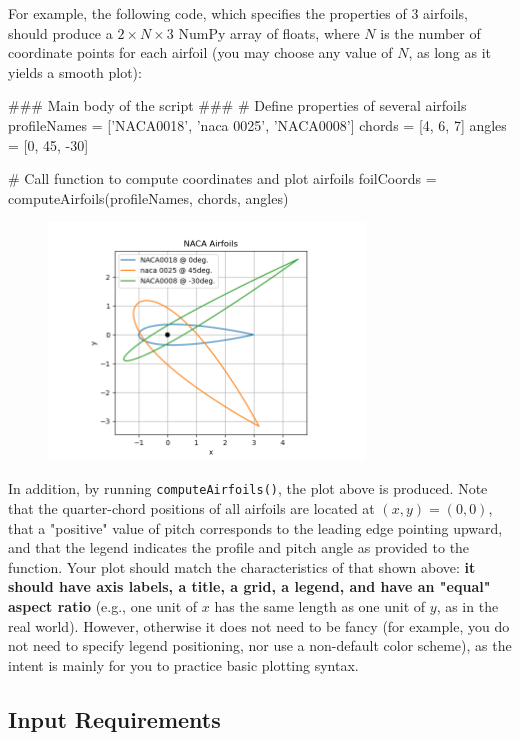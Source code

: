 \documentclass{homework}
\begin{document}
For example, the following code, which specifies the properties of 3 airfoils, should produce a $2\!\times\!N\!\times\!3$ NumPy array of floats, where $N$ is the number of coordinate points for each airfoil (you may choose any value of $N$, as long as it yields a smooth plot):

\begin{python}
### Main body of the script ### 
# Define properties of several airfoils
profileNames = ['NACA0018', 'naca 0025', 'NACA0008']
chords = [4, 6, 7]
angles = [0, 45, -30]

# Call function to compute coordinates and plot airfoils
foilCoords = computeAirfoils(profileNames, chords, angles)
\end{python}

\begin{figure}[t]
    \centering
    \includegraphics[width=0.75\textwidth]{exOutput.png}
\end{figure}

In addition, by running \texttt{computeAirfoils()}, the plot above is produced. Note that the quarter-chord positions of all airfoils are located at $(x,y) = (0,0)$, that a "positive" value of pitch corresponds to the leading edge pointing upward, and that the legend indicates the profile and pitch angle as provided to the function. Your plot should match the characteristics of that shown above: \textbf{it should have axis labels, a title, a grid, a legend, and have an "equal" aspect ratio} (e.g., one unit of $x$ has the same length as one unit of $y$, as in the real world). However, otherwise it does not need to be fancy (for example, you do not need to specify legend positioning, nor use a non-default color scheme), as the intent is mainly for you to practice basic plotting syntax.

\subsection*{Input Requirements}
\end{document}
